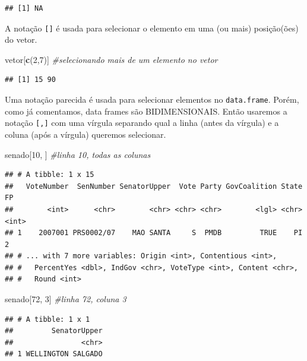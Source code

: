 \documentclass[]{book}
\newenvironment{Shaded}{\begin{snugshade}}{\end{snugshade}}
\newcommand{\KeywordTok}[1]{\textcolor[rgb]{0.13,0.29,0.53}{\textbf{#1}}}
\newcommand{\DecValTok}[1]{\textcolor[rgb]{0.00,0.00,0.81}{#1}}
\newcommand{\CommentTok}[1]{\textcolor[rgb]{0.56,0.35,0.01}{\textit{#1}}}
\newcommand{\NormalTok}[1]{#1}
\begin{document}
\begin{verbatim}
## [1] NA
\end{verbatim}

A notação \texttt{{[}{]}} é usada para selecionar o elemento em uma (ou
mais) posição(ões) do vetor.

\begin{Shaded}
\begin{Highlighting}[]
\NormalTok{vetor[}\KeywordTok{c}\NormalTok{(}\DecValTok{2}\NormalTok{,}\DecValTok{7}\NormalTok{)] }\CommentTok{#selecionando mais de um elemento no vetor}
\end{Highlighting}
\end{Shaded}

\begin{verbatim}
## [1] 15 90
\end{verbatim}

Uma notação parecida é usada para selecionar elementos no
\texttt{data.frame}. Porém, como já comentamos, data frames são
BIDIMENSIONAIS. Então usaremos a notação \texttt{{[},{]}} com uma
vírgula separando qual a linha (antes da vírgula) e a coluna (após a
vírgula) queremos selecionar.

\begin{Shaded}
\begin{Highlighting}[]
\NormalTok{senado[}\DecValTok{10}\NormalTok{, ] }\CommentTok{#linha 10, todas as colunas}
\end{Highlighting}
\end{Shaded}

\begin{verbatim}
## # A tibble: 1 x 15
##   VoteNumber  SenNumber SenatorUpper  Vote Party GovCoalition State    FP
##        <int>      <chr>        <chr> <chr> <chr>        <lgl> <chr> <int>
## 1    2007001 PRS0002/07    MAO SANTA     S  PMDB         TRUE    PI     2
## # ... with 7 more variables: Origin <int>, Contentious <int>,
## #   PercentYes <dbl>, IndGov <chr>, VoteType <int>, Content <chr>,
## #   Round <int>
\end{verbatim}

\begin{Shaded}
\begin{Highlighting}[]
\NormalTok{senado[}\DecValTok{72}\NormalTok{, }\DecValTok{3}\NormalTok{] }\CommentTok{#linha 72, coluna 3}
\end{Highlighting}
\end{Shaded}

\begin{verbatim}
## # A tibble: 1 x 1
##         SenatorUpper
##                <chr>
## 1 WELLINGTON SALGADO
\end{verbatim}
\end{document}
